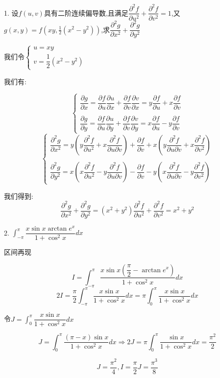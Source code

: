 1. 设$f(u,v)$具有二阶连续偏导数,且满足$\dfrac{\partial^2 f}{\partial u^2}+\dfrac{\partial^2 f}{\partial v^2}=1$,又$g(x,y)=f(xy,\frac{1}{2}(x^2-y^2))$,求$\dfrac{\partial^2 g}{\partial x^2}+\dfrac{\partial^2 g}{\partial y^2}$
\begin{solution}
	
	我们令$\left\lbrace 
	\begin{array}{l}
		u=xy\\
		v=\dfrac{1}{2}(x^2-y^2)
	\end{array}
	\right. $
	
	我们有: 
	
	$$\left\lbrace 
	\begin{array}{l}
		\dfrac{\partial g}{\partial x}=\dfrac{\partial f}{\partial u}\dfrac{\partial u}{\partial x}+\dfrac{\partial f}{\partial v}\dfrac{\partial v}{\partial x}=y\dfrac{\partial f}{\partial u}+x\dfrac{\partial f}{\partial v}\\
		
		\\
		\dfrac{\partial g}{\partial y}=\dfrac{\partial f}{\partial u}\dfrac{\partial u}{\partial y}+\dfrac{\partial f}{\partial v}\dfrac{\partial v}{\partial y}=x\dfrac{\partial f}{\partial u}-y\dfrac{\partial f}{\partial v}
	\end{array}
	\right. $$
	$$\left\lbrace 
	\begin{array}{l}
		\dfrac{\partial^2 g}{\partial x^2}=y(y\dfrac{\partial^2 f}{\partial u^2}+x\dfrac{\partial^2 f}{\partial u\partial v})+\dfrac{\partial f}{\partial v}+x(y\dfrac{\partial^2 f}{\partial u\partial v}+x\dfrac{\partial^2 f}{\partial v^2})\\
		
		\\
		\dfrac{\partial^2 g}{\partial y^2}=x(x\dfrac{\partial^2 f}{\partial u^2}-y\dfrac{\partial^2 f}{\partial u\partial v})-\dfrac{\partial f}{\partial v}-y(x\dfrac{\partial^2 f}{\partial u\partial v}-y\dfrac{\partial^2 f}{\partial v^2})
	\end{array}
	\right. $$
	
	我们得到: 
	$$\dfrac{\partial^2 g}{\partial x^2}+\dfrac{\partial^2 g}{\partial y^2}=(x^2+y^2)\dfrac{\partial^2 f}{\partial u^2}+\dfrac{\partial^2 f}{\partial v^2}=x^2+y^2$$
\end{solution}

2. $\int_{-\pi}^{\pi}\dfrac{x\sin x\arctan e^{x}}{1+\cos ^2 x}dx$
\begin{solution}
	
	区间再现
	
	$$I=\int_{-\pi}^{\pi}\dfrac{x\sin x(\dfrac{\pi}{2}-\arctan e^{x})}{1+\cos ^2 x}dx$$
	$$2I=\dfrac{\pi}{2}\int_{-\pi}^{\pi}\dfrac{x\sin x}{1+\cos ^2 x}dx=\pi\int_{0}^{\pi}\dfrac{x\sin x}{1+\cos ^2 x}dx$$
	
	令$J=\int_{0}^{\pi}\dfrac{x\sin x}{1+\cos ^2 x}dx$
	
	$$J=\int_{0}^{\pi}\dfrac{(\pi-x)\sin x}{1+\cos ^2 x}dx\Rightarrow 2J=\pi\int_{0}^{\pi}\dfrac{\sin x}{1+\cos ^2 x}dx=\dfrac{\pi^2}{2}$$
	
	$$J=\dfrac{\pi^2}{4},I=\dfrac{\pi}{2}J=\dfrac{\pi^3}{8}$$
\end{solution}

